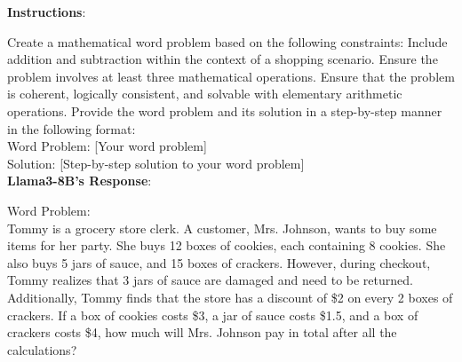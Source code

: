 \begin{tcolorbox}[breakable,boxrule=0.5pt,sharp corners,fontupper=\small,
colback=red!10, colframe=red!50!black, title={Failure: Overcomplicated Math Word Problem}]
\textbf{Instructions}: 

Create a mathematical word problem based on the following constraints: Include addition and subtraction within the context of a shopping scenario. Ensure the problem involves at least three mathematical operations. Ensure that the problem is coherent, logically consistent, and solvable with elementary arithmetic operations. Provide the word problem and its solution in a step-by-step manner in the following format:\\

Word Problem: [Your word problem]\\
Solution: [Step-by-step solution to your word problem]\\

\textbf{Llama3-8B's Response}:

Word Problem:\\
Tommy is a grocery store clerk. A customer, Mrs. Johnson, wants to buy some items for her party. She buys 12 boxes of cookies, each containing 8 cookies. She also buys 5 jars of sauce, and 15 boxes of crackers. However, during checkout, Tommy realizes that 3 jars of sauce are damaged and need to be returned. Additionally, Tommy finds that the store has a discount of \$2 on every 2 boxes of crackers. If a box of cookies costs \$3, a jar of sauce costs \$1.5, and a box of crackers costs \$4, how much will Mrs. Johnson pay in total after all the calculations?\\


\end{tcolorbox}
